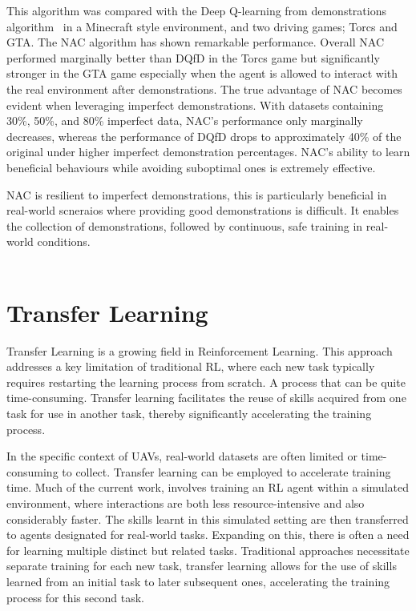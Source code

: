 This algorithm was compared with the Deep Q-learning from demonstrations algorithm~\cite{deepQLearningFromDemo} in a Minecraft style environment, and two driving games; Torcs and GTA.
The NAC algorithm has shown remarkable performance.
Overall NAC performed marginally better than DQfD in the Torcs game but significantly stronger in the GTA game especially when the agent is allowed to interact with the real environment after demonstrations.
The true advantage of NAC becomes evident when leveraging imperfect demonstrations.
With datasets containing 30\%, 50\%, and 80\% imperfect data, NAC's performance only marginally decreases, whereas the performance of DQfD drops to approximately 40\% of the original under higher imperfect demonstration percentages.
NAC's ability to learn beneficial behaviours while avoiding suboptimal ones is extremely effective.

NAC is resilient to imperfect demonstrations, this is particularly beneficial in real-world scneraios where providing good demonstrations is difficult.
It enables the collection of demonstrations, followed by continuous, safe training in real-world conditions. \\\\

\section{Transfer Learning}
Transfer Learning is a growing field in Reinforcement Learning.
This approach addresses a key limitation of traditional RL, where each new task typically requires restarting the learning process from scratch.
A process that can be quite time-consuming. 
Transfer learning facilitates the reuse of skills acquired from one task for use in another task, thereby significantly accelerating the training process.

In the specific context of UAVs, real-world datasets are often limited or time-consuming to collect.
Transfer learning can be employed to accelerate training time.
Much of the current work, involves training an RL agent within a simulated environment, where interactions are both less resource-intensive and also considerably faster. 
The skills learnt in this simulated setting are then transferred to agents designated for real-world tasks.
Expanding on this, there is often a need for learning multiple distinct but related tasks.
Traditional approaches necessitate separate training for each new task, transfer learning allows for the use of skills learned from an initial task to later subsequent ones, accelerating the training process for this second task.

